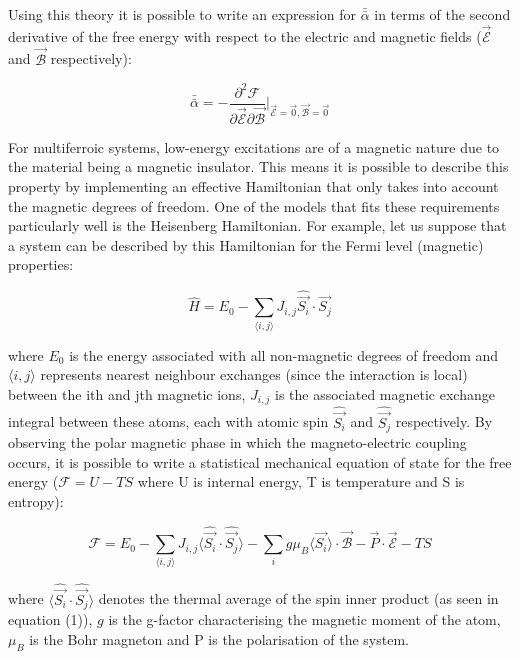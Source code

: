\documentclass[10pt]{article}
\begin{document}
Using this theory it is possible to write an expression for $\bar{\bar{\alpha}}$ in terms of the second derivative of the free energy with respect to the electric and magnetic fields ($\vec{\mathcal{E}}$ and $\vec{\mathcal{B}}$ respectively):

\begin{equation*}
\bar{\bar{\alpha}} = -\frac{\partial^2 \mathcal{F}}{\partial \vec{\mathcal{E}}\partial\vec{\mathcal{B}}}\biggr\vert_{\vec{\mathcal{E}}=\vec{0}, \vec{\mathcal{B}} = \vec{0}}
\end{equation*}

For multiferroic systems, low-energy excitations are of a magnetic nature due to the material being a magnetic insulator. This means it is possible to describe this property by implementing an effective Hamiltonian that only takes into account the magnetic degrees of freedom. One of the models that fits these requirements particularly well is the Heisenberg Hamiltonian. For example, let us suppose that a system can be described by this Hamiltonian for the Fermi level (magnetic) properties:

\begin{equation}
\hat{H} = E_0 - \sum_{\langle i,j \rangle} J_{i,j}\hat{\vec{S_i}}\cdot \hat{\vec{S_j}}
\end{equation}

where $E_0$ is the energy associated with all non-magnetic degrees of freedom and $\langle i,j \rangle$ represents nearest neighbour exchanges (since the interaction is local) between the ith and jth magnetic ions, $J_{i,j}$ is the associated magnetic exchange integral between these atoms, each with atomic spin $\hat{\vec{S_i}}$ and $\hat{\vec{S_j}}$ respectively. By observing the polar magnetic phase in which the magneto-electric coupling occurs, it is possible to write a statistical mechanical equation of state for the free energy ($\mathcal{F} = U - TS$ where U is internal energy, T is temperature and S is entropy):

\begin{equation*}
\mathcal{F} = E_0 - \sum_{\langle i,j \rangle} J_{i,j}\langle \hat{\vec{S_i}}\cdot \hat{\vec{S_j}} \rangle - \sum_{i}g\mu_{B}\langle \vec{S_i}\rangle \cdot \mathcal{\vec{B}} - \vec{P}\cdot \mathcal{\vec{E}} - TS
\end{equation*}

where $\langle \hat{\vec{S_i}}\cdot \hat{\vec{S_j}} \rangle $ denotes the thermal average of the spin inner product (as seen in equation (1)), $g$ is the g-factor characterising the magnetic moment of the atom, $\mu_{B}$ is the Bohr magneton and P is the polarisation of the system. 
\end{document}
